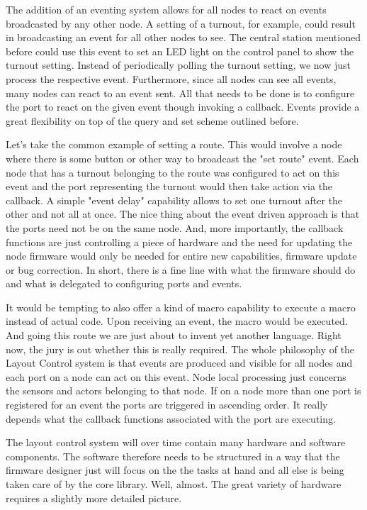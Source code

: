 The addition of an eventing system allows for all nodes to react on events broadcasted by any other node. A setting of a turnout, for example, could result in broadcasting an event for all other nodes to see. The central station mentioned before could use this event to set an LED light on the control panel to show the turnout setting. Instead of periodically polling the turnout setting, we now just process the respective event. Furthermore, since all nodes can see all events, many nodes can react to an event sent. All that needs to be done is to configure the port to react on the given event though invoking a callback. Events provide a great flexibility on top of the query and set scheme outlined before.

Let's take the common example of setting a route. This would involve a node where there is some button or other way to broadcast the "set route" event. Each node that has a turnout belonging to the route was configured to act on this event and the port representing the turnout would then take action via the callback. A simple "event delay" capability allows to set one turnout after the other and not all at once. The nice thing about the event driven approach is that the ports need not be on the same node. And, more importantly, the callback functions are just controlling a piece of hardware and the need for updating the node firmware would only be needed for entire new capabilities, firmware update or bug correction. In short, there is a fine line with what the firmware should do and what is delegated to configuring ports and events.

It would be tempting to also offer a kind of macro capability to execute a macro instead of actual code. Upon receiving an event, the macro would be executed. And going this route we are just about to invent yet another language. Right now, the jury is out whether this is really required. The whole philosophy of the Layout Control system is that events are produced and visible for all nodes and each port on a node can act on this event. Node local processing just concerns the sensors and actors belonging to that node. If on a node more than one port is registered for an event the ports are triggered in ascending order. It really depends what the callback functions associated with the port are executing.


The layout control system will over time contain many hardware and software components. The software therefore needs to be structured in a way that the firmware designer just will focus on the the tasks at hand and all else is being taken care of by the core library. Well, almost. The great variety of hardware requires a slightly more detailed picture.


